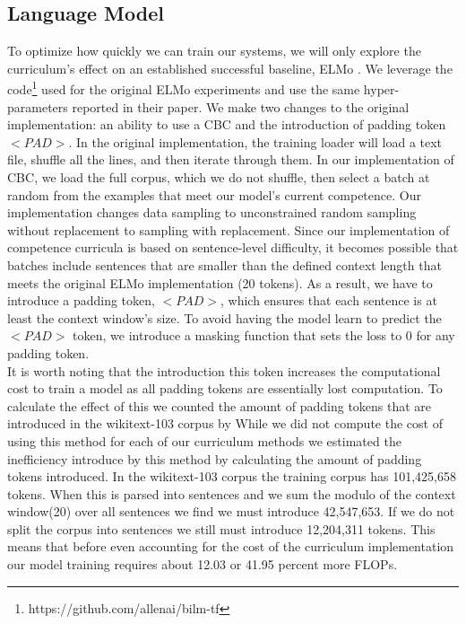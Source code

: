 \subsection{Language Model}
To optimize how quickly we can train our systems, we will only explore the curriculum's effect on an established successful baseline, ELMo \cite{Smith2019ContextualWR}. We leverage the code\footnote{https://github.com/allenai/bilm-tf} used for the original ELMo experiments and use the same hyper-parameters reported in their paper. We make two changes to the original implementation: an ability to use a CBC and the introduction of padding token $<PAD>$. In the original implementation, the training loader will load a text file, shuffle all the lines, and then iterate through them. In our implementation of CBC, we load the full corpus, which we do not shuffle, then select a batch at random from the examples that meet our model's current competence. Our implementation changes data sampling to unconstrained random sampling without replacement to sampling with replacement. Since our implementation of competence curricula is based on sentence-level difficulty, it becomes possible that batches include sentences that are smaller than the defined context length that meets the original ELMo implementation (20 tokens). As a result, we have to introduce a padding token, $<PAD>$, which ensures that each sentence is at least the context window's size. To avoid having the model learn to predict the $<PAD>$ token, we introduce a masking function that sets the loss to 0 for any padding token. \\
It is worth noting that the introduction this token increases the computational cost to train a model as all padding tokens are essentially lost computation. To calculate the effect of this we counted the amount of padding tokens that are introduced in the wikitext-103 corpus by While we did not compute the cost of using this method for each of our curriculum methods we estimated the inefficiency introduce by this method by calculating the amount of padding tokens introduced. In the wikitext-103 corpus the training corpus has 101,425,658 tokens. When this is parsed into sentences and we sum the modulo of the context window(20) over all sentences we find we must introduce 42,547,653. If we do not split the corpus into sentences we still must introduce 12,204,311 tokens. This means that before even accounting for the cost of the curriculum implementation our model training requires about 12.03 or 41.95 percent more FLOPs. 
